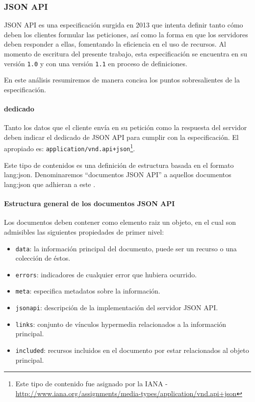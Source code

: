 \subsubsection{JSON API}
\label{soa:tecnologias:json-api}

JSON API es una especificación surgida en 2013 que intenta definir tanto cómo deben los clientes formular las peticiones, así como la forma en que los servidores deben responder a ellas, fomentando la eficiencia en el uso de recursos. Al momento de escritura del presente trabajo, esta especificación se encuentra en su versión \texttt{1.0} y con una versión \texttt{1.1} en proceso de definiciones.

En este análisis resumiremos de manera concisa los puntos sobresalientes de la especificación.

\paragraph{ dedicado}

Tanto los datos que el cliente envía en su petición como la respuesta del servidor deben indicar el  dedicado de JSON API para cumplir con la especificación. El  apropiado es: \texttt{application/vnd.api+json}\footnote{Este tipo de contenido fue asignado por la IANA - \url{http://www.iana.org/assignments/media-types/application/vnd.api+json}}.

Este tipo de contenidos es una definición de estructura basada en el formato \gls{lang:json}. Denominaremos ``documentos JSON API'' a aquellos documentos \gls{lang:json} que adhieran a este .

\paragraph{Estructura general de los documentos JSON API}

Los documentos deben contener como elemento raiz un objeto, en el cual son admisibles las siguientes propiedades de primer nivel:

\begin{itemize}
  \item \texttt{data}: la información principal del documento, puede ser un recurso o una colección de éstos.
  \item \texttt{errors}: indicadores de cualquier error que hubiera ocurrido.
  \item \texttt{meta}: especifica metadatos sobre la información.
  \item \texttt{jsonapi}: descripción de la implementación del servidor JSON API.
  \item \texttt{links}: conjunto de vínculos hypermedia relacionados a la información principal.
  \item \texttt{included}: recursos incluidos en el documento por estar relacionados al objeto principal.
\end{itemize}

